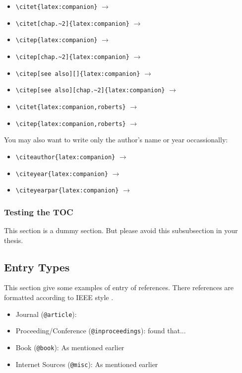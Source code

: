 \begin{itemize}[nosep]
\item \verb|\citet{latex:companion}| $\to$ \citet{latex:companion}
\item \verb|\citet[chap.~2]{latex:companion}| $\to$ \citet[chap.~2]{latex:companion}
\item \verb|\citep{latex:companion}| $\to$ \citep{latex:companion}
\item \verb|\citep[chap.~2]{latex:companion}| $\to$ \citep[chap.~2]{latex:companion}
\item \verb|\citep[see also][]{latex:companion}| $\to$ \citep[see also][]{latex:companion}
\item \verb|\citep[see also][chap.~2]{latex:companion}| $\to$ \citep[see also][chap.~2]{latex:companion}
\item \verb|\citet{latex:companion,roberts}| $\to$ \citet{latex:companion,roberts}
\item \verb|\citep{latex:companion,roberts}| $\to$ \citep{latex:companion,roberts}
\end{itemize}

You may also want to write only the author's name or year occassionally:

\begin{itemize}[nosep]
\item \verb|\citeauthor{latex:companion}| $\to$ \citeauthor{latex:companion}
\item \verb|\citeyear{latex:companion}| $\to$ \citeyear{latex:companion}
\item \verb|\citeyearpar{latex:companion}| $\to$ \citeyearpar{latex:companion}
\end{itemize}
 

\subsubsection{Testing the TOC}

This section is a dummy section. But please avoid this subsubsection in your thesis. 

\subsection{Entry Types}

This section give some examples of entry of references. There references are formatted according to IEEE style \citep{ieee}. 

\begin{itemize}
	\item Journal (\verb|@article|): \citet{othman2019effect} 
	\item Proceeding/Conference (\verb|@inproceedings|): \citet{wanna2018fracture} found that... 
	\item Book (\verb|@book|): As mentioned earlier \citep{latex:companion} 
	\item Internet Sources (\verb|@misc|): As mentioned earlier \citep{lim:latextypesetting} 
\end{itemize}